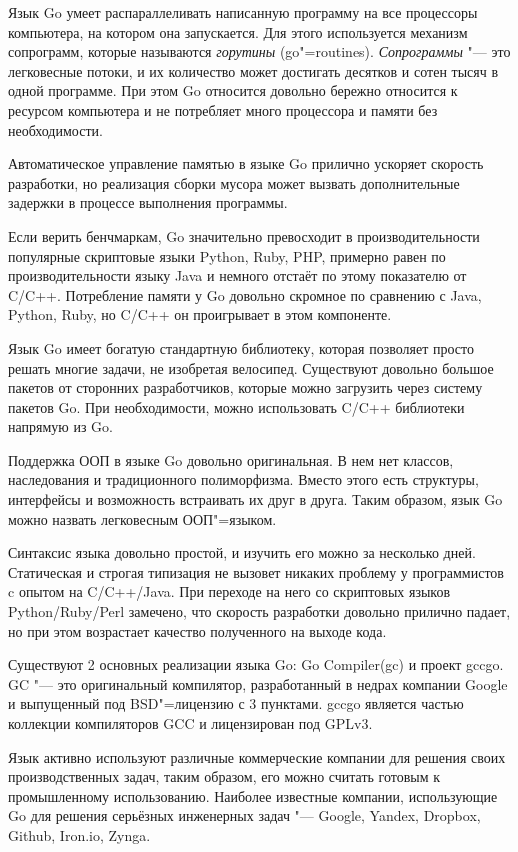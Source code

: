 \documentclass[10pt, a5paper]{article}
\begin{document}
Язык Go умеет распараллеливать написанную программу на все процессоры компьютера, на котором она запускается. Для этого используется механизм сопрограмм, которые называются \emph{горутины} (go"=routines). \emph{Сопрограммы} "--- это легковесные потоки, и их количество может достигать десятков и сотен тысяч в одной программе. При этом Go относится довольно бережно относится к ресурсом компьютера и не потребляет много процессора и памяти без необходимости.

Автоматическое управление памятью в языке Go прилично ускоряет скорость разработки, но реализация сборки мусора может вызвать дополнительные задержки в процессе выполнения программы.

Если верить бенчмаркам, Go значительно превосходит в производительности популярные скриптовые языки Python, Ruby, PHP, примерно равен по производительности языку Java и немного отстаёт по этому показателю от C/C++. Потребление памяти у Go довольно скромное по сравнению с Java, Python, Ruby, но C/C++ он проигрывает в этом компоненте.

Язык Go имеет богатую стандартную библиотеку, которая позволяет просто решать многие задачи, не изобретая велосипед. Существуют довольно большое пакетов от сторонних разработчиков, которые можно загрузить через систему пакетов Go. При необходимости, можно использовать C/C++ библиотеки напрямую из Go.

Поддержка ООП в языке Go довольно оригинальная. В нем нет классов, наследования и традиционного полиморфизма. Вместо этого есть структуры, интерфейсы и возможность встраивать их друг в друга. Таким образом, язык Go можно назвать легковесным ООП"=языком.

Синтаксис языка довольно простой, и изучить его можно за несколько дней. Статическая и строгая типизация не вызовет никаких проблему у программистов c опытом на C/C++/Java. При переходе на него со скриптовых языков Python/Ruby/Perl замечено, что скорость разработки довольно прилично падает, но при этом возрастает качество полученного на выходе кода.

Существуют 2 основных реализации языка Go: Go Compiler(gc) и проект gccgo. GC "--- это оригинальный компилятор, разработанный в недрах компании Google и выпущенный под BSD"=лицензию с 3 пунктами. gccgo является частью коллекции компиляторов GCC и лицензирован под GPLv3.

Язык активно используют различные коммерческие компании для решения своих производственных задач, таким образом, его можно считать готовым к промышленному использованию. Наиболее известные компании, использующие Go для решения серьёзных инженерных задач "--- Google, Yandex, Dropbox, Github, Iron.io, Zynga.
\end{document}
